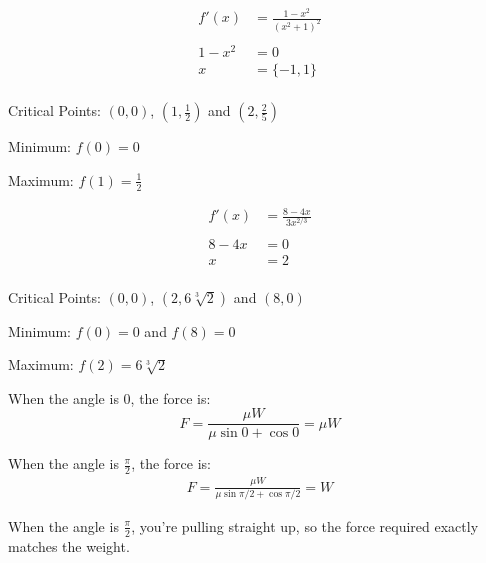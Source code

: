 \documentclass[letterpaper]{exam}
\begin{document}
\begin{description}
    \newpage

    \item[53] 
      \begin{align*}
        f'(x)   & = \frac{1 - x^2}{\left(x^2 + 1\right)^2} \\
        \\
        1 - x^2 & = 0 \\
        x       & = \{ -1, 1 \} \\
      \end{align*}

      \begin{itemize*}
        \item Critical Points: $(0, 0)$, $\left( 1, \frac{1}{2} \right)$ and 
          $\left( 2, \frac{2}{5} \right)$
        \item Minimum: $f(0) = 0$
        \item Maximum: $f(1) = \frac{1}{2}$ 
      \end{itemize*}

    \item[56] 
      \begin{align*}
        f'(x)  & = \frac{8 - 4x}{3 x^{2/3}} \\
        \\
        8 - 4x & = 0 \\
        x      & = 2 \\
      \end{align*}

      \begin{itemize*}
        \item Critical Points: $(0, 0)$, $( 2, 6 \sqrt[3]{2} )$ and $(8, 0)$
        \item Minimum: $f(0) = 0$ and $f(8) = 0$
        \item Maximum: $f(2) = 6 \sqrt[3]{2}$ 
      \end{itemize*}

    \item[70]
      When the angle is $0$, the force is:
      \[
        F = \frac{\mu W}{\mu \sin 0 + \cos 0} = \mu W 
        \]

      When the angle is $\frac{\pi}{2}$, the force is:
      \begin{align*}
        F = \frac{\mu W}{\mu \sin \pi/2 + \cos \pi/2} = W 
      \end{align*}

      When the angle is $\frac{\pi}{2}$, you're pulling straight up, so the force required exactly
      matches the weight.


\end{description}
\end{document}
